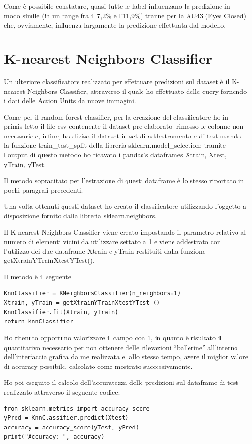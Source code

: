 Come è possibile constatare, quasi tutte le label influenzano la predizione in modo simile (in un range fra il 7,2\% e l’11,9\%) tranne per la AU43 (Eyes Closed) che, ovviamente, influenza largamente la predizione effettuata dal modello.

\section{K-nearest Neighbors Classifier}
Un ulteriore classificatore realizzato per effettuare predizioni sul dataset è il K-nearest Neighbors Classifier, attraverso il quale ho effettuato delle query fornendo i dati delle Action Units da nuove immagini.

Come per il random forest classifier, per la creazione del classificatore ho in primis letto il file csv contenente il dataset pre-elaborato, rimosso le colonne non necessarie e, infine, ho diviso il dataset in set di addestramento e di test usando la funzione train\_test\_split della libreria sklearn.model\_selection; tramite l’output di questo metodo ho ricavato i pandas’s dataframes Xtrain, Xtest, yTrain, yTest.

Il metodo sopracitato per l’estrazione di questi dataframe è lo stesso riportato in pochi paragrafi precedenti.

Una volta ottenuti questi dataset ho creato il classificatore utilizzando l’oggetto a disposizione fornito dalla libreria sklearn.neighbors.

Il K-nearest Neighbors Classifier viene creato impostando il parametro relativo al numero di elementi vicini da utilizzare settato a 1 e viene addestrato con l’utilizzo dei due dataframe Xtrain e yTrain restituiti dalla funzione getXtrainYTrainXtestYTest().

Il metodo è il seguente
\begin{verbatim}
KnnClassifier = KNeighborsClassifier(n_neighbors=1)
Xtrain, yTrain = getXtrainYTrainXtestYTest ()
KnnClassifier.fit(Xtrain, yTrain)
return KnnClassifier
\end{verbatim}

Ho ritenuto opportuno valorizzare il campo con 1, in quanto è risultato il quantitativo necessario per non ottenere delle rilevazioni “ballerine” all’interno dell’interfaccia grafica da me realizzata e, allo stesso tempo, avere il miglior valore di accuracy possibile, calcolato come mostrato successivamente.

Ho poi eseguito il calcolo dell’accuratezza delle predizioni sul dataframe di test realizzato attraverso il seguente codice:
\begin{verbatim}
from sklearn.metrics import accuracy_score
yPred = KnnClassifier.predict(Xtest)
accuracy = accuracy_score(yTest, yPred)
print("Accuracy: ", accuracy)
\end{verbatim}

